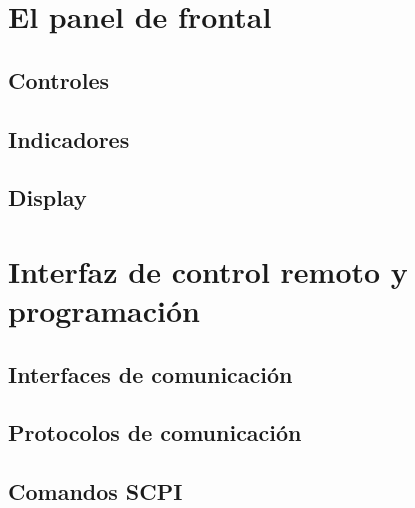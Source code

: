 {	\section{El panel de frontal}

	\subsection{Controles}

	\subsection{Indicadores}

	\subsection{Display}

	\section{Interfaz de control remoto y programación}
	
	\subsection{Interfaces de comunicación}

	\subsection{Protocolos de comunicación}
	
	\subsection{Comandos SCPI}

}